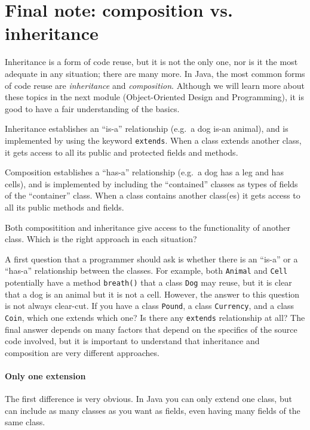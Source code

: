 \section{Final note: composition vs. inheritance}
\label{sec:final-note:-comp}

Inheritance is a form of code reuse, but it is not the only one, nor
is it the most adequate in any situation; there are many more. In
Java, the most common forms of code reuse are \emph{inheritance} and
\emph{composition}. Although we will learn more about these topics in
the next module (Object-Oriented Design and Programming), it is good
to have a fair understanding of the basics. 

Inheritance establishes an ``is-a'' relationship (e.g.~a dog is-an 
animal), and is implemented by
using the keyword \verb+extends+. When a class extends another class,
it gets access to all its public and protected fields and methods. 

Composition establishes a ``has-a'' relationship (e.g.~a dog has a leg
and has cells), and is implemented by including the ``contained''
classes as types of fields of the ``container'' class.  When a class
contains another class(es) it gets access to all its public methods
and fields. 

Both compositition and inheritance give access to the functionality of
another class. Which is the right approach in each situation? 

A first
question that a programmer should ask is whether there is an ``is-a''
or a ``has-a'' relationship between the classes. For example, both
\verb+Animal+ and \verb+Cell+ potentially have a method
\verb+breath()+ that a class \verb+Dog+ may reuse, but it is clear
that a dog is an animal but it is not a cell. However, the answer to
this question is not
always clear-cut. If you have a class \verb+Pound+, a class
\verb+Currency+, and a class \verb+Coin+, which one extends which one?
Is there any \verb+extends+ relationship at all? The final answer
depends on many factors that depend on the specifics of the source
code involved, but it is important to understand that inheritance and
composition are very different approaches. 

\paragraph{Only one extension}
\label{sec:only-one-extension}

The first difference is very obvious. In Java you can only extend one
class, but can include as many classes as you want as fields, even
having many fields of the same class. 

